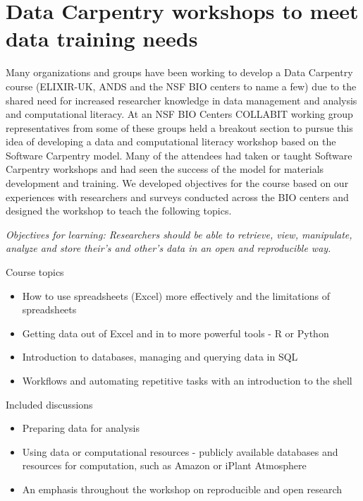 \documentclass[11pt]{article}
\begin{document}
\section{Data Carpentry workshops to meet data training needs}

Many organizations and groups have been working to develop a Data Carpentry course (ELIXIR-UK, ANDS and the NSF BIO centers to name a few) due to the shared need for increased researcher knowledge in data management and analysis and computational literacy. At an NSF BIO Centers COLLABIT working group representatives from some of these groups held a breakout section to pursue this idea of developing a data and computational literacy workshop based on the Software Carpentry model. Many of the attendees had taken or taught Software Carpentry workshops and
had seen the success of the model for materials development and training. We developed objectives for the course based on our experiences with researchers and surveys conducted across the BIO centers and designed the workshop to teach the following topics.

\emph{Objectives for learning: Researchers should be able to retrieve, view, manipulate, analyze and store their's and other's data in an open and reproducible way.}

Course topics
\begin{itemize}
\item How to use spreadsheets (Excel) more effectively and the limitations of spreadsheets
\item Getting data out of Excel and in to more powerful tools - R or Python
\item Introduction to databases, managing and querying data in SQL
\item Workflows and automating repetitive tasks with an introduction to the shell
\end{itemize}

Included discussions
\begin{itemize}
\item Preparing data for analysis
\item Using data or computational resources - publicly available databases and resources for computation, such as Amazon or  iPlant Atmosphere
\item An emphasis throughout the workshop on reproducible and open research 
\end{itemize}
\end{document}
